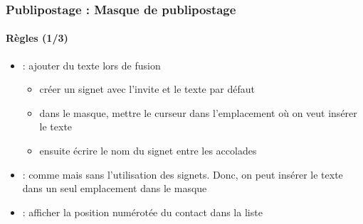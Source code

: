 \documentclass[xcolor=table]{beamer}
\begin{document}
\begin{frame}
\frametitle{Publipostage : Masque de publipostage}
\framesubtitle{Règles (1/3)}

\begin{minipage}{0.63\textwidth}
	\begin{itemize}
		\item {} : ajouter du texte lors de fusion
		\begin{itemize}
			\item créer un signet avec l'invite et le texte par défaut
			\item dans le masque, mettre le curseur dans l'emplacement où on veut insérer le texte
			\item {} ensuite écrire le nom du signet entre les accolades
		\end{itemize}
		\item {} : comme  mais sans l'utilisation des signets. Donc, on peut insérer le texte dans un seul emplacement dans le masque
		\item {} : afficher la position numérotée du contact dans la liste
	\end{itemize}
\end{minipage}
\begin{minipage}{0.36\textwidth}
	
	
\end{minipage}

\end{frame}
\end{document}
